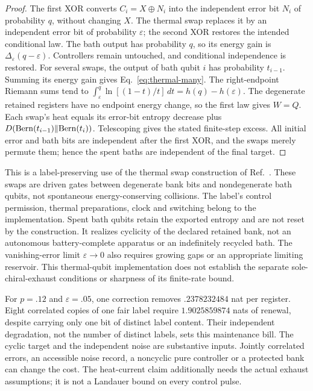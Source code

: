 \documentclass[12pt,a4paper]{article}
\begin{document}
\begin{proof}
The first XOR converts \(C_i=X\oplus N_i\) into the independent
error bit \(N_i\) of probability \(q\), without changing \(X\).
The thermal swap replaces it by an independent error bit of probability
\(\varepsilon\); the second XOR restores the intended conditional law.
The bath output has probability \(q\), so its energy gain is
\(\Delta_\varepsilon(q-\varepsilon)\).
Controllers remain untouched, and conditional independence is restored.
For several swaps, the output of bath qubit \(i\) has probability
\(t_{i-1}\). Summing its energy gain gives
Eq.~\eqref{eq:thermal-many}. The right-endpoint Riemann sums tend to
\(\int_\varepsilon^q\ln[(1-t)/t]\,dt=h(q)-h(\varepsilon)\).
The degenerate retained registers have no endpoint energy change,
so the first law gives \(W=Q\).
Each swap's heat equals its error-bit entropy decrease plus
\(D({\rm Bern}(t_{i-1})\Vert{\rm Bern}(t_i))\).
Telescoping gives the stated finite-step excess. All initial error and
bath bits are independent after the first XOR, and the swaps merely
permute them; hence the spent baths are independent of the final target.
\end{proof}

This is a label-preserving use of the thermal swap construction
of Ref.~\cite{ReebWolf2014}. These swaps are driven gates between degenerate bank bits and
nondegenerate bath qubits, not spontaneous energy-conserving collisions.
The label's control permission, thermal preparations, clock and switching
belong to the implementation. Spent bath qubits retain the exported
entropy and are not reset by the construction. It realizes cyclicity of
the declared retained bank, not an autonomous battery-complete apparatus
or an indefinitely recycled bath. The vanishing-error limit
\(\varepsilon\to0\) also requires growing gaps or an appropriate
limiting reservoir. This thermal-qubit implementation does not establish
the separate sole-chiral-exhaust conditions or sharpness of its finite-rate
bound.


For $p=.12$ and $\varepsilon=.05$, one correction removes
$.2378232484$ nat per register. Eight correlated copies of one fair
label require $1.9025859874$ nats of renewal, despite carrying only
one bit of distinct label content. Their independent degradation, not
the number of distinct labels, sets this maintenance bill.
The cyclic target and the independent noise are substantive inputs.
Jointly correlated errors, an accessible noise record, a noncyclic pure
controller or a protected bank can change the cost. The heat-current
claim additionally needs the actual exhaust assumptions; it is not a
Landauer bound on every control pulse.
\end{document}
